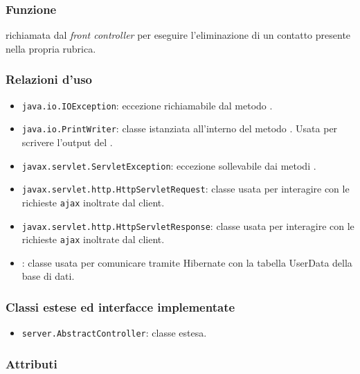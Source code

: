 

\subsubsection*{Funzione}
 richiamata dal \textit{front controller} per eseguire l'eliminazione di un contatto presente nella propria rubrica.

\subsubsection*{Relazioni d'uso}

\begin{itemize}
		\item \texttt{java.io.IOException}: eccezione richiamabile dal metodo .
	\item \texttt{java.io.PrintWriter}: classe istanziata all'interno del metodo . Usata per scrivere l'output del .
	\item \texttt{javax.servlet.ServletException}: eccezione sollevabile dai metodi .
	\item \texttt{javax.servlet.http.HttpServletRequest}: classe usata per interagire con le richieste \texttt{ajax} inoltrate dal client.
	\item \texttt{javax.servlet.http.HttpServletResponse}: classe usata per interagire con le richieste \texttt{ajax} inoltrate dal client. 
	\item {}: classe usata per comunicare tramite Hibernate con la tabella UserData della base di dati.
\end{itemize}

\subsubsection*{Classi estese ed interfacce implementate}
\begin{itemize}
	\item \texttt{server.AbstractController}: classe estesa.
\end{itemize}

\subsubsection*{Attributi}

